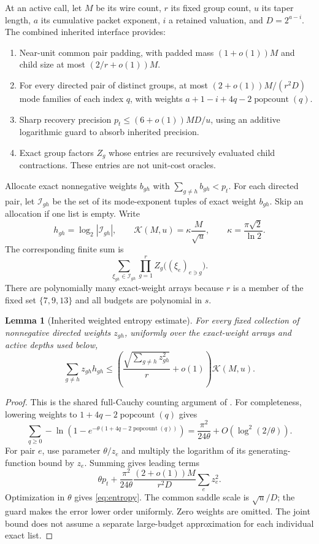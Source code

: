 \documentclass[11pt]{article}
\newtheorem{lemma}[theorem]{Lemma}
\theoremstyle{remark}\newtheorem{remark}[theorem]{Remark}
\newcommand{\K}{\mathcal K}
\newcommand{\pc}{\operatorname{popcount}}
\begin{document}
At an active call, let $M$ be its wire count, $r$ its fixed group count,
$u$ its taper length, $a$ its cumulative packet exponent, $i$ a retained
valuation, and $D=2^{a-i}$. The combined inherited interface provides:
\begin{enumerate}
\item Near-unit common pair padding, with padded mass $(1+o(1))M$ and
child size at most $(2/r+o(1))M$.
\item For every directed pair of distinct groups, at most
$(2+o(1))M/(r^2D)$ mode families of each index $q$, with weights
$a+1-i+4q-2\pc(q)$.
\item Sharp recovery precision $p_t\le(6+o(1))MD/u$, using an additive
logarithmic guard to absorb inherited precision.
\item Exact group factors $Z_g$ whose entries are recursively evaluated
child contractions. These entries are not unit-cost oracles.
\end{enumerate}

Allocate exact nonnegative weights $b_{gh}$ with $\sum_{g\ne h}b_{gh}<p_t$.
For each directed pair, let $\mathcal I_{gh}$ be the set of its mode-exponent
tuples of exact weight $b_{gh}$. Skip an allocation if one list is empty.
Write
\[
 h_{gh}=\log_2|\mathcal I_{gh}|,\qquad
 \K(M,u)=\kappa\frac{M}{\sqrt u},\qquad
 \kappa=\frac{\pi\sqrt2}{\ln2}.
\]
The corresponding finite sum is
\begin{equation}
 \sum_{\xi_{gh}\in\mathcal I_{gh}}
     \prod_{g=1}^r Z_g\bigl((\xi_e)_{e\ni g}\bigr).
 \label{eq:graphsum}
\end{equation}
There are polynomially many exact-weight arrays because $r$ is a member of
the fixed set $\{7,9,13\}$ and all budgets are polynomial in $s$.

\begin{lemma}[Inherited weighted entropy estimate]\label{lem:entropy}
For every fixed collection of nonnegative directed weights $z_{gh}$,
uniformly over the exact-weight arrays and active depths used below,
\begin{equation}
 \sum_{g\ne h}z_{gh}h_{gh}
 \le\left(\frac{\sqrt{\sum_{g\ne h}z_{gh}^2}}r+o(1)\right)\K(M,u).
 \label{eq:entropy}
\end{equation}
\end{lemma}
\begin{proof}
This is the shared full-Cauchy counting argument of \cite{adaptive,tree}.
For completeness, lowering weights to $1+4q-2\pc(q)$ gives
\[
 \sum_{q\ge0}-\ln(1-e^{-\theta(1+4q-2\pc(q))})
 =\frac{\pi^2}{24\theta}+O(\log^2(2/\theta)).
\]
For pair $e$, use parameter $\theta/z_e$ and multiply the logarithm of its
generating-function bound by $z_e$. Summing gives leading terms
\[
 \theta p_t+\frac{\pi^2}{24\theta}
       \frac{(2+o(1))M}{r^2D}\sum_ez_e^2.
\]
Optimization in $\theta$ gives \eqref{eq:entropy}. The common saddle scale is
$\sqrt u/D$; the guard makes the error lower order uniformly. Zero weights
are omitted. The joint bound does not assume a separate large-budget
approximation for each individual exact list.
\end{proof}
\end{document}

